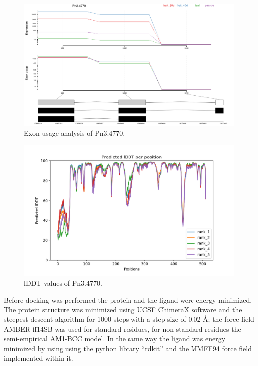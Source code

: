 \documentclass[12pt]{article}
\begin{document}
	\FloatBarrier
	\begin{figure}[h!]
		\centering
		\includegraphics[width=\textwidth-50pt]{../5/known/Transcripts/7.png}
		\caption{\centering Exon usage analysis of Pn3.4770.}
		\label{fig5k_1}
	\end{figure}
	\FloatBarrier
	
	\FloatBarrier
	\begin{figure}[h!]
		\centering
		\includegraphics[width=\textwidth-50pt]{../5/known/AlphaFold2/Met_dioixi_ef326_plddt.png}
		\caption{\centering lDDT values of Pn3.4770.}
		\label{fig5k_3}
	\end{figure}
	\FloatBarrier
	
	\newpage
	
	Before docking was performed the protein and the ligand were energy minimized. The protein structure was minimized using UCSF ChimeraX software \cite{chimera,chimera_2} and the steepest descent algorithm for 1000 steps with a step size of 0.02 \r{A}; the force field AMBER ff14SB was used for standard residues, for non standard residues the semi-empirical AM1-BCC model. \cite{am1_bcc,am1_bcc_2,am1_bcc_3} In the same way the ligand was energy minimized by using using the python library ``rdkit'' and the MMFF94 force field implemented within it. \cite{rdkit,rdkit_mmff}
	
\end{document}
